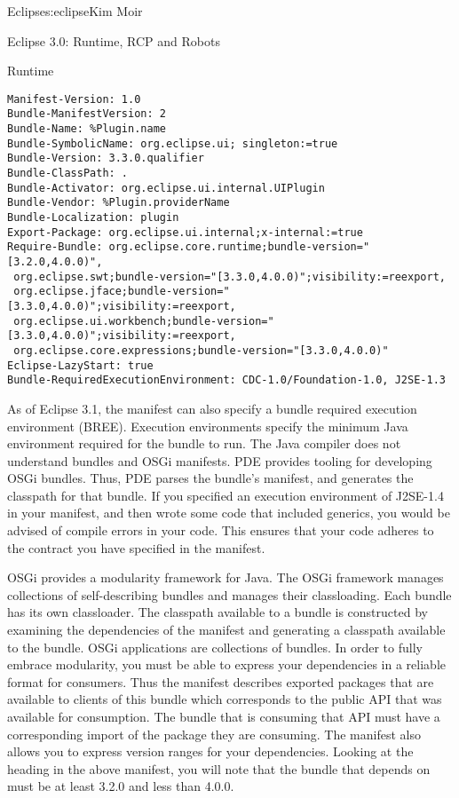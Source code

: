 \begin{aosachapter}{Eclipse}{s:eclipse}{Kim Moir}
\begin{aosasect1}{Eclipse 3.0: Runtime, RCP and Robots}
\begin{aosasect2}{Runtime}
\begin{verbatim}
Manifest-Version: 1.0
Bundle-ManifestVersion: 2
Bundle-Name: %Plugin.name
Bundle-SymbolicName: org.eclipse.ui; singleton:=true
Bundle-Version: 3.3.0.qualifier
Bundle-ClassPath: .
Bundle-Activator: org.eclipse.ui.internal.UIPlugin
Bundle-Vendor: %Plugin.providerName
Bundle-Localization: plugin
Export-Package: org.eclipse.ui.internal;x-internal:=true
Require-Bundle: org.eclipse.core.runtime;bundle-version="[3.2.0,4.0.0)",
 org.eclipse.swt;bundle-version="[3.3.0,4.0.0)";visibility:=reexport,
 org.eclipse.jface;bundle-version="[3.3.0,4.0.0)";visibility:=reexport,
 org.eclipse.ui.workbench;bundle-version="[3.3.0,4.0.0)";visibility:=reexport,
 org.eclipse.core.expressions;bundle-version="[3.3.0,4.0.0)"
Eclipse-LazyStart: true
Bundle-RequiredExecutionEnvironment: CDC-1.0/Foundation-1.0, J2SE-1.3
\end{verbatim}

As of Eclipse 3.1, the manifest can also specify a bundle required
execution environment (BREE). Execution environments specify the
minimum Java environment required for the bundle to run. The Java
compiler does not understand bundles and OSGi manifests. PDE provides
tooling for developing OSGi bundles. Thus, PDE parses the bundle's
manifest, and generates the classpath for that bundle. If you
specified an execution environment of J2SE-1.4 in your manifest, and
then wrote some code that included generics, you would be advised of
compile errors in your code. This ensures that your code adheres to
the contract you have specified in the manifest.

OSGi provides a modularity framework for Java. The OSGi framework
manages collections of self-describing bundles and manages their
classloading. Each bundle has its own classloader. The classpath
available to a bundle is constructed by examining the dependencies of
the manifest and generating a classpath available to the bundle. OSGi
applications are collections of bundles. In order to fully embrace
modularity, you must be able to express your dependencies in a
reliable format for consumers. Thus the manifest describes exported
packages that are available to clients of this bundle which
corresponds to the public API that was available for consumption.  The
bundle that is consuming that API must have a corresponding import of
the package they are consuming. The manifest also allows you to
express version ranges for your dependencies.  Looking at
the  heading in the above manifest, you will note
that the  bundle that
 depends on must be at least 3.2.0 and less than
4.0.0.


\end{aosasect2}
\end{aosasect1}
\end{aosachapter}

